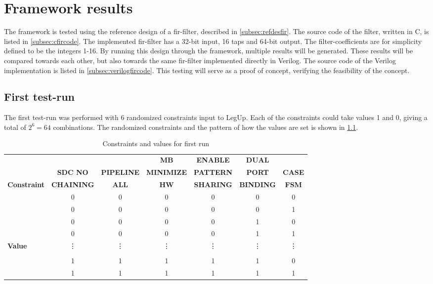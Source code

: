 \chapter{\label{chp:frameworkresults}Framework results}
The framework is tested using the reference design of a \gls{fir}-filter, described in \cref{subsec:refdesfir}. The source code of the filter, written in C, is listed in \cref{subsec:cfircode}. The implemented \gls{fir}-filter has a 32-bit input, 16 taps and 64-bit output. The filter-coefficients are for simplicity defined to be the integers 1-16. By running this design through the framework, multiple results will be generated. These results will be compared towards each other, but also towards the same \gls{fir}-filter implemented directly in Verilog. The source code of the Verilog implementation is listed in \cref{subsec:verilogfircode}. This testing will serve as a proof of concept, verifying the feasibility of the concept.

\section{\label{sec:firstrun}First test-run}
The first test-run was performed with 6 randomized constraints input to LegUp. Each of the constraints could take values 1 and 0, giving a total of $2^6=64$ combinations. The randomized constraints and the pattern of how the values are set is shown in \cref{tab:randomconstraint}.

\begin{table}
\tiny
    \begin{center}
    \begin{tabular}{l|cccccc}
     & & & \textbf{MB} & \textbf{ENABLE} & \textbf{DUAL} & \\
          &
          \textbf{SDC NO} & 
          \textbf{PIPELINE} & 
          \textbf{MINIMIZE} & 
          \textbf{PATTERN} & 
          \textbf{PORT} &
          \textbf{CASE} \\
        \textbf{Constraint}
           & \textbf{CHAINING}
           & \textbf{ALL}
           & \textbf{HW}
           & \textbf{SHARING}
           & \textbf{BINDING}
           & \textbf{FSM}
    \\ \midrule
    & 0 & 0 & 0 & 0 & 0 & 0 \\
    & 0 & 0 & 0 & 0 & 0 & 1 \\
    & 0 & 0 & 0 & 0 & 1 & 0 \\
    & 0 & 0 & 0 & 0 & 1 & 1 \\
    \textbf{Value} & \vdots & \vdots & \vdots & \vdots & \vdots & \vdots \\
    & &  &  &  &  &  \\
    & 1 & 1 & 1 & 1 & 1 & 0 \\
    & 1 & 1 & 1 & 1 & 1 & 1
    \\ \bottomrule
    \end{tabular}
    \caption{\label{tab:randomconstraint}Constraints and values for first run}
    \end{center}
\end{table}

